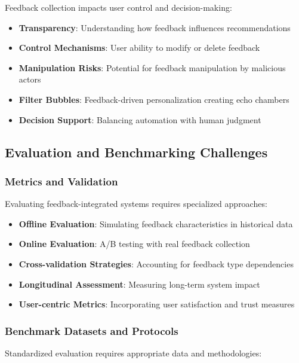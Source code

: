 Feedback collection impacts user control and decision-making:

\begin{itemize}
    \item \textbf{Transparency}: Understanding how feedback influences recommendations
    \item \textbf{Control Mechanisms}: User ability to modify or delete feedback
    \item \textbf{Manipulation Risks}: Potential for feedback manipulation by malicious actors
    \item \textbf{Filter Bubbles}: Feedback-driven personalization creating echo chambers
    \item \textbf{Decision Support}: Balancing automation with human judgment
\end{itemize}

\subsection{Evaluation and Benchmarking Challenges}

\subsubsection{Metrics and Validation}

Evaluating feedback-integrated systems requires specialized approaches:

\begin{itemize}
    \item \textbf{Offline Evaluation}: Simulating feedback characteristics in historical data
    \item \textbf{Online Evaluation}: A/B testing with real feedback collection
    \item \textbf{Cross-validation Strategies}: Accounting for feedback type dependencies
    \item \textbf{Longitudinal Assessment}: Measuring long-term system impact
    \item \textbf{User-centric Metrics}: Incorporating user satisfaction and trust measures
\end{itemize}

\subsubsection{Benchmark Datasets and Protocols}

Standardized evaluation requires appropriate data and methodologies:


